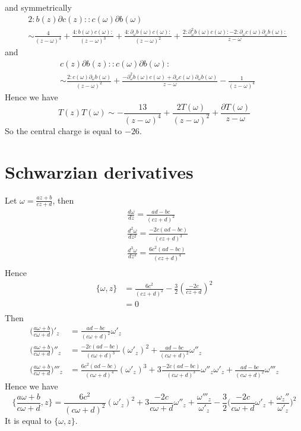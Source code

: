 \documentclass[11pt,a4paper]{article}
\theoremstyle{definition}
\begin{document}
 and symmetrically 
 \[
	\begin{aligned}
	&2: b(z) \partial c(z):: c(\omega) \partial b(\omega)\\
	& \sim \frac{4}{(z-\omega)^4} + \frac{4:b(\omega) c(\omega):}{(z-\omega)^3} + \frac{4 :\partial_\omega b(\omega) c(\omega):}{(z-\omega)^2} + \frac{2: \partial_\omega^2 b(\omega) c(\omega): -2 : \partial_\omega c(\omega) \partial_\omega b(\omega):}{z-\omega} 
	\end{aligned}
 \]
 and
 \[
	\begin{aligned}
	&c(z)\partial b(z) :: c(\omega) \partial b(\omega):\\
	& \sim \frac{2: c(\omega) \partial_{\omega}b(\omega) }{(z-\omega)^2} + \frac{-\partial^2_\omega b(\omega) c(\omega)+\partial_\omega c(\omega)\partial_\omega b(\omega)}{z-\omega} - \frac{1}{(z-\omega)^4}
	\end{aligned}
 \]
 Hence we have 
 \[
 T(z)T(\omega) \sim -\frac{13}{(z-\omega)^4} + \frac{2T(\omega)}{(z-\omega)^2} + \frac{\partial T(\omega)}{z-\omega}
 \]
 So the central charge is equal to $-26$.
\section{Schwarzian derivatives}
Let $\omega = \frac{az+b}{cz +d}$, then
\[
\begin{aligned}
&\frac{d\omega}{d z} = \frac{ad-bc}{(cz+d)^2}\\
&\frac{d^2\omega}{dz^2} = \frac{-2c(ad-bc)}{(cz+d)^3}\\
&\frac{d^3\omega}{dz^3} = \frac{6c^2(ad-bc)}{(cz+d)^4}\\
\end{aligned}
\]
Hence
\[
\begin{aligned}
\{\omega,z\} & = \frac{6c^2}{(cz+d)^2} -\frac{3}{2}(\frac{-2c}{cz+d})^2\\
&=0\\
\end{aligned}
\]
Then
\[
\begin{aligned}
\Big(\frac{a \omega +b}{c \omega +d}\Big)'_z &= \frac{ad-bc}{(c\omega +d)^2} \omega'_z\\
\Big(\frac{a \omega +b}{c \omega +d}\Big)''_z&= \frac{-2c(ad-bc)}{(c\omega+d)^3}(\omega'_z)^2 + \frac{ad-bc}{(c\omega +d)^2} \omega''_z\\
\Big(\frac{a \omega +b}{c \omega +d}\Big)'''_z&= \frac{6c^2(ad-bc)}{(c\omega +d)^4}(\omega'_z)^3 +3 \frac{-2c(ad-bc)}{(c\omega+d)^3} \omega''_z \omega'_z + \frac{ad-bc}{(c\omega +d)^2} \omega'''_z
\end{aligned}
\]
Hence we have
\[
\{ \frac{a \omega +b}{c\omega+d}, z\} = \frac{6c^2}{(c\omega +d)^2}(\omega'_z)^2 + 3 \frac{-2c}{c\omega+d} \omega''_z + \frac{\omega'''_z}{\omega'_z} - \frac{3}{2}\Big(\frac{-2c}{c\omega +d} \omega'_z + \frac{\omega_z''}{\omega'_z}\Big)^2
\]
It is equal to $\{\omega, z\}$.



\end{document}
